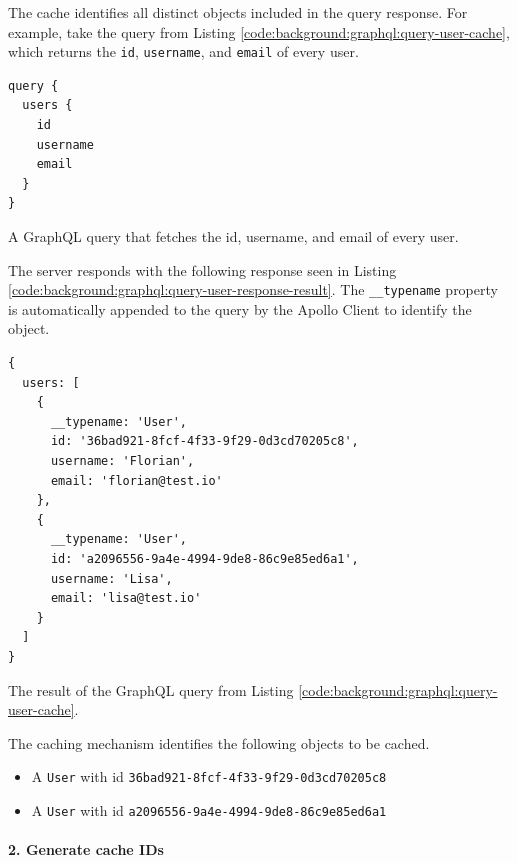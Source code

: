 The cache identifies all distinct objects included in the query response. For example, take the query from Listing \ref{code:background:graphql:query-user-cache}, which returns the \texttt{id}, \texttt{username}, and \texttt{email} of every user.

\ifshowListings
\begin{listing}[H]
    \begin{verbatim}
query {
  users {
    id
    username
    email
  }
}
    \end{verbatim}
    \caption{A GraphQL query that fetches the id, username, and email of every user.}\label{code:background:graphql:query-user-cache}
\end{listing}
\fi

\noindent The server responds with the following response seen in Listing \ref{code:background:graphql:query-user-response-result}. The \texttt{\_\_typename} property is automatically appended to the query by the Apollo Client to identify the object.

\ifshowListings
\begin{listing}[H]
    \begin{verbatim}
{
  users: [
    {
      __typename: 'User',
      id: '36bad921-8fcf-4f33-9f29-0d3cd70205c8',
      username: 'Florian',
      email: 'florian@test.io'
    },
    {
      __typename: 'User',
      id: 'a2096556-9a4e-4994-9de8-86c9e85ed6a1',
      username: 'Lisa',
      email: 'lisa@test.io'
    }
  ]
}
    \end{verbatim}
    \caption{The result of the GraphQL query from Listing \ref{code:background:graphql:query-user-cache}.}\label{code:background:graphql:query-user-response-result}
\end{listing}
\fi

The caching mechanism identifies the following objects to be cached.

\begin{itemize}
    \item A \texttt{User} with id \texttt{36bad921-8fcf-4f33-9f29-0d3cd70205c8}
    \item A \texttt{User} with id \texttt{a2096556-9a4e-4994-9de8-86c9e85ed6a1}
\end{itemize}

\paragraph{2. Generate cache IDs}\label{paragraph:background:graphql:apollo-server-client:data-normalization:generate-cache-ids}

